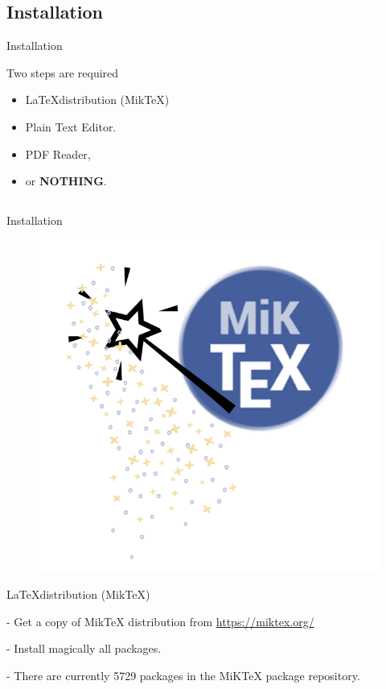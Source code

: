 \documentclass{beamer}
\begin{document}
\subsection{Installation}

\begin{frame}{Installation}

	\begin{block}{Two steps are required}
	\begin{itemize}
	    \item \LaTeX distribution (MikTeX)
	    \item Plain Text Editor.
	    \item PDF Reader,
	    \item or \textbf{NOTHING}.
	\end{itemize}
	
 	\end{block}
\end{frame}

\subsection*{}

\begin{frame}{Installation}



\begin{figure}
\includegraphics[width=0.9\linewidth]{figures/magically.png} 
\label{fig:wrapfig}
\end{figure}
	\begin{block}{\LaTeX distribution (MikTeX)}
	\end{block}
- Get a copy of MikTeX distribution from \url{https://miktex.org/}
	     
	   -  Install magically all packages. 
	     
	    - There are currently 5729 packages in the MiKTeX package repository.


\end{frame}
\end{document}
